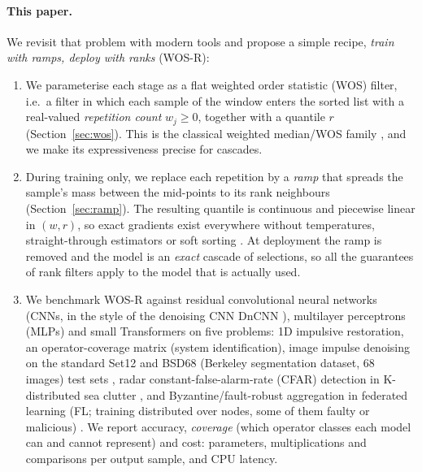 \documentclass[11pt,a4paper]{article}
\theoremstyle{definition}
\theoremstyle{remark}
\begin{document}
\paragraph{This paper.} We revisit that problem with modern tools and propose a simple recipe, \emph{train with ramps,
deploy with ranks} (WOS-R):
\begin{enumerate}
\item We parameterise each stage as a flat weighted order statistic (WOS) filter, i.e.\ a filter in which each sample
  of the window enters the sorted list with a real-valued \emph{repetition count} $w_j\ge0$, together with a quantile
  $r$ (Section~\ref{sec:wos}). This is the classical weighted median/WOS family \cite{brownrigg1984,yliharja1991,yin1996},
  and we make its expressiveness precise for cascades.
\item During training only, we replace each repetition by a \emph{ramp} that spreads the sample's mass between the
  mid-points to its rank neighbours (Section~\ref{sec:ramp}). The resulting quantile is continuous and piecewise linear
  in $(w,r)$, so exact gradients exist everywhere without temperatures, straight-through estimators \cite{bengio2013ste}
  or soft sorting \cite{grover2019,blondel2020,petersen2021}. At deployment the ramp is removed and the model is an
  \emph{exact} cascade of selections, so all the guarantees of rank filters apply to the model that is actually used.
\item We benchmark WOS-R against residual convolutional neural networks (CNNs, in the style of the denoising CNN DnCNN
  \cite{zhang2017dncnn}), multilayer perceptrons (MLPs) and small Transformers \cite{liu2021swin} on five problems: 1D impulsive restoration, an operator-coverage matrix (system identification),
  image impulse denoising on the standard Set12 and BSD68 (Berkeley segmentation dataset, 68 images) test sets
  \cite{martin2001bsd}, radar constant-false-alarm-rate (CFAR) detection in K-distributed sea clutter
  \cite{rohling1983,ward2013}, and Byzantine/fault-robust aggregation in federated learning (FL; training distributed over nodes, some of them
  faulty or malicious) \cite{yin2018byz,karimireddy2021,allouah2023}. We report accuracy, \emph{coverage} (which operator classes each model
  can and cannot represent) and cost: parameters, multiplications and comparisons per output sample, and CPU latency.
\end{enumerate}
\end{document}
